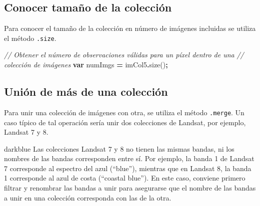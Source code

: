 \documentclass[
  12pt,
  letterpaper,
  twoside]{book}
\newenvironment{Shaded}{\begin{snugshade}}{\end{snugshade}}
\newcommand{\CommentTok}[1]{\textcolor[rgb]{0.56,0.35,0.01}{\textit{#1}}}
\newcommand{\FunctionTok}[1]{\textcolor[rgb]{0.00,0.00,0.00}{#1}}
\newcommand{\KeywordTok}[1]{\textcolor[rgb]{0.13,0.29,0.53}{\textbf{#1}}}
\newcommand{\NormalTok}[1]{#1}
\newcommand{\OperatorTok}[1]{\textcolor[rgb]{0.81,0.36,0.00}{\textbf{#1}}}
\begin{document}
\hypertarget{conocer-tamauxf1o-de-la-colecciuxf3n}{%
\subsection*{Conocer tamaño de la colección}\label{conocer-tamauxf1o-de-la-colecciuxf3n}}

Para conocer el tamaño de la colección en número de imágenes incluidas se utiliza el método \texttt{.size}.

\begin{Shaded}
\begin{Highlighting}[]
\CommentTok{// Obtener el número de observaciones válidas para un píxel dentro de una }
\CommentTok{// colección de imágenes}
\KeywordTok{var}\NormalTok{ numImgs }\OperatorTok{=}\NormalTok{ imCol5}\OperatorTok{.}\FunctionTok{size}\NormalTok{()}\OperatorTok{;}
\end{Highlighting}
\end{Shaded}

\hypertarget{uniuxf3n-de-muxe1s-de-una-colecciuxf3n}{%
\subsection*{Unión de más de una colección}\label{uniuxf3n-de-muxe1s-de-una-colecciuxf3n}}

Para unir una colección de imágenes con otra, se utiliza el método \texttt{.merge}. Un caso típico de tal operación sería unir dos colecciones de Landsat, por ejemplo, Landsat 7 y 8.

\begin{bluebox2}

\begin{awesomeblock}{5pt}{\faLightbulb}{darkblue}
Las colecciones Landsat 7 y 8 no tienen las mismas bandas, ni los nombres de las bandas corresponden entre sí. Por ejemplo, la banda 1 de Landsat 7 corresponde al espectro del azul (``blue''), mientras que en Landsat 8, la banda 1 corresponde al azul de costa (``coastal blue''). En este caso, conviene primero filtrar y renombrar las bandas a unir para asegurarse que el nombre de las bandas a unir en una colección corresponda con las de la otra.

\end{awesomeblock}

\end{bluebox2}
\end{document}
